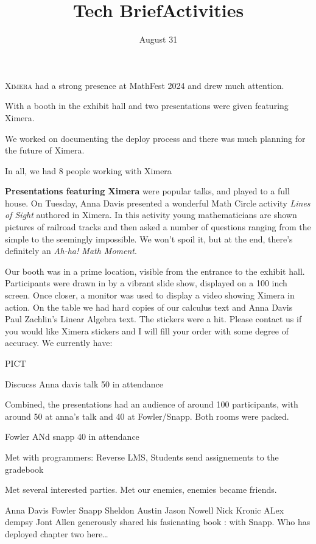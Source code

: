 \documentclass{techbrief}
\title{Tech Brief}
\title{Activities}
\date{August 31}
\begin{document}
\pagestyle{main}
\thispagestyle{title}
\noindent

\lettrine[lines=2]{X}{imera} had a strong presence at MathFest 2024 and drew
much attention.

With a booth in the exhibit hall and two presentations were given featuring
Ximera.

We worked on documenting the deploy process and there was much planning for the
future of Ximera.

In all, we had 8 people working with Ximera

\begin{xframe}
    \textbf{Presentations featuring Ximera} were popular talks, and played to a
    full house.
    On Tuesday, Anna Davis presented a wonderful Math Circle activity
    \textit{Lines of Sight} authored in Ximera.
    In this activity young mathematicians are shown pictures of railroad tracks
    and then asked a number of questions ranging from the simple to the seemingly
    impossible. We won't spoil it, but at the end, there's definitely an \textit{Ah-ha! Math Moment}.
\end{xframe}

Our booth was in a prime location, visible from the entrance to the exhibit
hall.
Participants were drawn in by a vibrant slide show, displayed on a 100 inch
screen.
Once closer, a monitor was used to display a video showing Ximera in action.
On the table we had hard copies of our calculus text and Anna Davis Paul
Zachlin's Linear Algebra text.
The stickers were a hit.
Please contact us if you would like Ximera stickers and I will fill your order
with some degree of accuracy.
We currently have:

PICT

Discucss Anna davis talk 50 in attendance

Combined, the presentations had an audience of around 100 participants, with
around 50 at anna's talk and 40 at Fowler/Snapp.
Both rooms were packed.

Fowler ANd snapp 40 in attendance

Met with programmers: Reverse LMS, Students send assignements to the gradebook

Met several interested parties. Met our enemies, enemies became friends.

Anna Davis
Fowler
Snapp
Sheldon
Austin
Jason Nowell
Nick Kronic
ALex dempsy
Jont Allen generously shared his fasicnating book :  with Snapp. Who has
deployed chapter two here\dots
\end{document}
